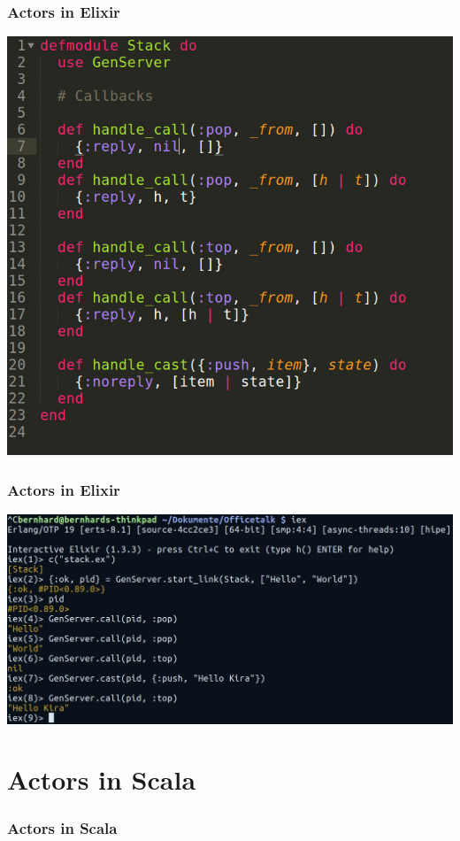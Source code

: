 \documentclass{beamer}
\begin{document}

\begin{frame}
\frametitle{Actors in Elixir}
\includegraphics[width=0.6\linewidth]{./GenServerCode.jpg}
\end{frame}


\begin{frame}
\frametitle{Actors in Elixir}
\includegraphics[width=1.25\linewidth]{./GenServerTerminal.jpg}
\end{frame}


\section{Actors in Scala}


\begin{frame}
\frametitle{Actors in Scala}
\end{frame}

\end{document}
